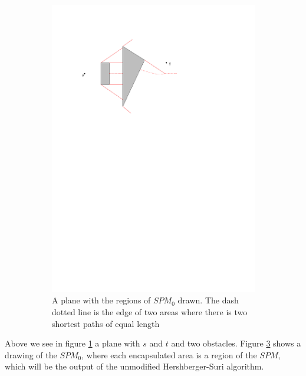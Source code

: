 \begin{figure}[H]
\begin{subfigure}{.5\textwidth}
  \label{fig:spmplane}
\end{subfigure}%
\begin{subfigure}{.5\textwidth}
  \centering
  \includegraphics[width=.95\linewidth]{figures/spm0.pdf}
  \caption{A plane with the regions of $SPM_0$ drawn. The dash dotted line is the edge of two 
  		   areas where there is two shortest paths of equal length}
  \label{fig:planewithspm0drawn}
\end{subfigure}
\caption{}
\end{figure}

Above we see in figure \ref{fig:spmplane} a plane with $s$ and $t$ and two obstacles. Figure 
\ref{fig:planewithspm0drawn} shows a drawing of the $SPM_0$, where each encapsulated area is 
a region of the $SPM$, which will be the output of the unmodified Hershberger-Suri algorithm. 

